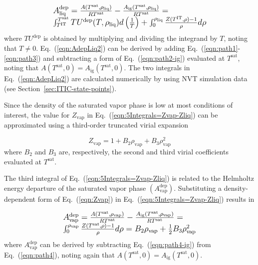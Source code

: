 \documentclass[5p,times]{elsarticle}
\begin{document}
\begin{equation}
\begingroup
\large
\begin{array}{l}
A^\mathrm{dep}_\mathrm{liq} = \frac{A(T^\mathrm{sat},\rho_\mathrm{liq})}{RT^\mathrm{sat}} - \frac{A_\mathrm{ig}(T^\mathrm{sat},\rho_\mathrm{liq})}{RT^\mathrm{sat}}
= 
\\
\int _{T^\mathrm{IT}}^{T^\mathrm{sat}} TU^\mathrm{dep}(T,\rho_\mathrm{liq}) d\left(\frac{1}{T}\right)+\int _{0}^{\rho_\mathrm{liq}} \frac{Z(T^\mathrm{IT},\rho)-1}{\rho}  d\rho    
\end{array} 
\endgroup
\label{eqn:AdepLiq2}
\end{equation}
where $TU^\mathrm{dep}$ is obtained by multiplying and dividing the integrand by $T$, noting that $T\neq 0$. Eq.~(\ref{eqn:AdepLiq2}) can be derived by adding Eq.~(\ref{eqn:path1}-\ref{eqn:path3}) and subtracting a form of Eq.~(\ref{eqn:path2-ig}) evaluated at $T^\mathrm{sat}$, noting that $A(T^\mathrm{sat},0)=A_\mathrm{ig}(T^\mathrm{sat},0)$. The two integrals in Eq.~(\ref{eqn:AdepLiq2}) are calculated numerically by using NVT simulation data (see Section~\ref{sec:ITIC-state-points}).

Since the density of the saturated vapor phase is low at most conditions of interest, the value for $Z_{\mathrm{vap}}$ in Eq.~(\ref{eqn:5Integrals=Zvap-Zliq}) can be approximated using a third-order truncated virial expansion

\begin{equation}
{Z_{\mathrm{vap}}} = 1 + {B_2}{\rho_{\mathrm{vap}}} + {B_3}\rho_{\mathrm{vap}}^2
\label{eqn:Zvap}
\end{equation}
where $B_2$ and $B_3$ are, respectively, the second and third virial coefficients evaluated at $T^\mathrm{sat}$. 

The third integral of Eq.~(\ref{eqn:5Integrals=Zvap-Zliq}) is related to the Helmholtz energy departure of the saturated vapor phase $(A^\mathrm{dep}_\mathrm{vap})$. Substituting a density-dependent form of Eq.~(\ref{eqn:Zvap}) in Eq.~(\ref{eqn:5Integrals=Zvap-Zliq}) results in

\begin{equation}
\begingroup
\large
\begin{array}{l}
A^\mathrm{dep}_\mathrm{vap} = \frac{A(T^\mathrm{sat},\rho_\mathrm{vap})}{RT^\mathrm{sat}} - \frac{A_\mathrm{ig}(T^\mathrm{sat},\rho_\mathrm{vap})}{RT^\mathrm{sat}}
= 
\\
\int _{0}^{\rho_\mathrm{vap}} \frac{Z(T^\mathrm{sat},\rho)-1}{\rho}  d\rho = B_2\rho_\mathrm{vap}+\frac{1}{2}B_3\rho_\mathrm{vap}^2    
\end{array} 
\endgroup
\label{eqn:IntZvap}
\end{equation}
where $A^\mathrm{dep}_\mathrm{vap}$ can be derived by subtracting Eq.~(\ref{eqn:path4-ig}) from Eq.~(\ref{eqn:path4}), noting again that $A(T^\mathrm{sat},0)=A_\mathrm{ig}(T^\mathrm{sat},0)$.
\end{document}
